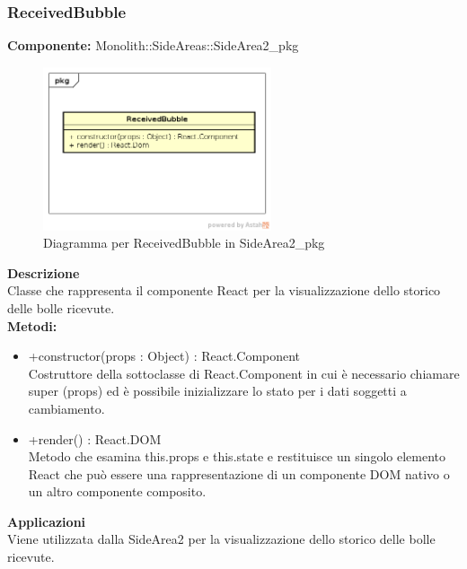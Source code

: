 \clearpage

\subsubsection{ReceivedBubble}
\textbf{Componente:}  Monolith::SideAreas::SideArea2\_pkg\\
   \FloatBarrier
   \begin{figure}[ht]
   \centering
   \includegraphics[width=0.6\textwidth]{img/single-ReceivedBubble}
   \caption{{Diagramma per ReceivedBubble in SideArea2\_pkg}}
\end{figure}
\FloatBarrier
\textbf{Descrizione}\\
Classe che rappresenta il componente React per la visualizzazione dello storico delle bolle ricevute. \\
\textbf{Metodi:} 
\begin{itemize}
\item +constructor(props : Object) : React.Component 
\\
Costruttore della sottoclasse di React.Component in cui è necessario chiamare super (props) ed è possibile inizializzare lo stato per i dati soggetti a cambiamento.
\item +render() : React.DOM 
\\
Metodo che esamina this.props e this.state e restituisce un singolo elemento React che può essere una rappresentazione di un componente DOM nativo o un altro componente composito.
\end{itemize} 


\textbf{Applicazioni}\\
Viene utilizzata dalla SideArea2 per la visualizzazione dello storico delle bolle ricevute. 


\clearpage

